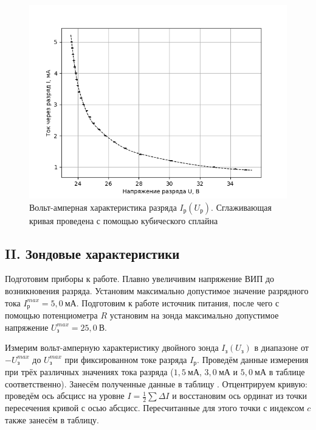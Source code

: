 \documentclass[a4paper,10pt]{article}
\begin{document}
\begin{figure}[h]
	\centering
	\includegraphics[scale=0.70]{Zond_VAH}
	\caption{Вольт-амперная характеристика разряда $I_{\text{р}}\left(U_{\text{р}}\right)$. Сглаживающая кривая проведена с помощью кубического сплайна} \label{Zond_VAH}
\end{figure}

\subsection*{II. Зондовые характеристики}

Подготовим приборы к работе. Плавно увеличивим напряжение ВИП до возникновения разряда. Установим максимально допустимое значение разрядного тока $I_{\text{р}}^{max}=5,0~\text{мА}$. Подготовим к работе источник питания, после чего с помощью потенциометра $R$ установим на зонда максимально допустимое напряжение $U_{\text{з}}^{max}=25,0~\text{В}$.

Измерим вольт-амперную характеристику двойного зонда $I_{\text{з}}\left(U_{\text{з}}\right)$ в диапазоне от $-U^{max}_{\text{з}}$ до $U^{max}_{\text{з}}$ при фиксированном токе разряда $I_{\text{р}}$. Проведём данные измерения при трёх различных значениях тока разряда ($1,5~\text{мА}$, $3,0~\text{мА}$ и $5,0~\text{мА}$ в таблице соответственно). Занесём полученные данные в таблицу . Отцентрируем кривую: проведём ось абсцисс на уровне $I=\frac{1}{2}\sum\Delta I$ и восстановим ось ординат из точки пересечения кривой с осью абсцисс. Пересчитанные для этого точки с индексом $c$ также занесём в таблицу.
\end{document}
